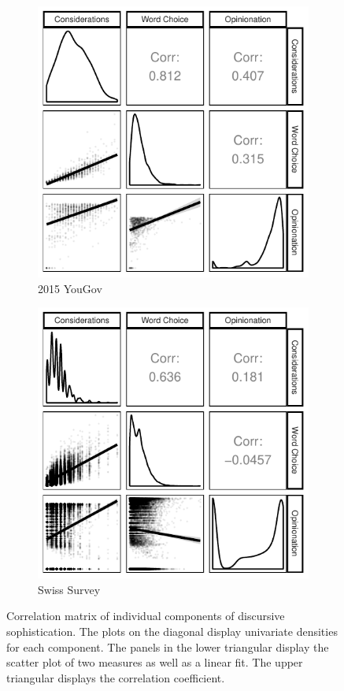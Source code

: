 \begin{figure}[h]
    \begin{subfigure}[h]{0.49\textwidth}
        \centering
        \includegraphics{../fig/yg_corplot_components.pdf}
        \caption{2015 YouGov}
    \end{subfigure}
    \begin{subfigure}[h]{0.49\textwidth}
         \centering
         \includegraphics{../fig/swiss_corplot_components.pdf}
         \caption{Swiss Survey}
    \end{subfigure}
    \caption{Correlation matrix of individual components of discursive sophistication. The plots on the diagonal display univariate densities for each component. The panels in the lower triangular display the scatter plot of two measures as well as a linear fit. The upper triangular displays the correlation coefficient.}\label{fig:components}
\end{figure}



